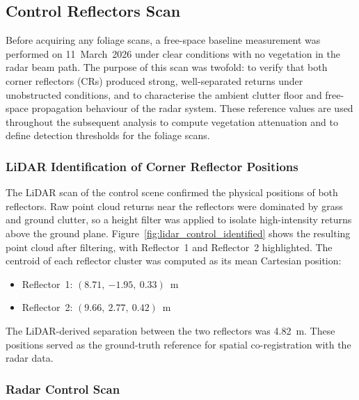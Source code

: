 
\subsection{Control Reflectors Scan}

Before acquiring any foliage scans, a free-space baseline measurement was performed on
11~March~2026 under clear conditions with no vegetation in the radar beam path.
The purpose of this scan was twofold: to verify that both corner reflectors (CRs)
produced strong, well-separated returns under unobstructed conditions, and to characterise
the ambient clutter floor and free-space propagation behaviour of the radar system.
These reference values are used throughout the subsequent analysis to compute
vegetation attenuation and to define detection thresholds for the foliage scans.

\subsubsection*{LiDAR Identification of Corner Reflector Positions}

The LiDAR scan of the control scene confirmed the physical positions of both reflectors.
Raw point cloud returns near the reflectors were dominated by grass and ground clutter,
so a height filter was applied to isolate high-intensity returns above the ground plane.
Figure~\ref{fig:lidar_control_identified} shows the resulting point cloud
after filtering, with Reflector~1 and Reflector~2 highlighted.
The centroid of each reflector cluster was computed as its mean Cartesian position:

\begin{itemize}
  \item Reflector~1: $(8.71,\ {-1.95},\ 0.33)$~m
  \item Reflector~2: $(9.66,\ 2.77,\ 0.42)$~m
\end{itemize}

The LiDAR-derived separation between the two reflectors was 4.82~m.
These positions served as the ground-truth reference for spatial co-registration
with the radar data.

\subsubsection*{Radar Control Scan}

